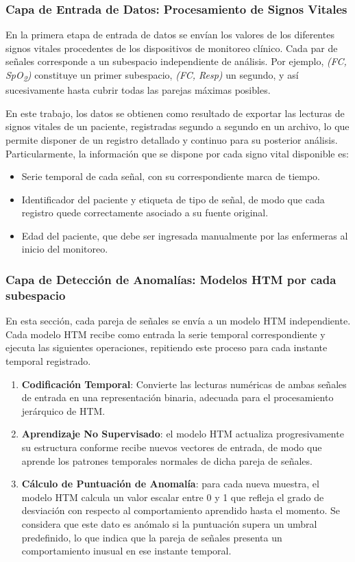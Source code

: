 \subsubsection*{Capa de Entrada de Datos: Procesamiento de Signos Vitales}

En la primera etapa de entrada de datos se envían los valores de los diferentes signos vitales procedentes de los dispositivos de monitoreo clínico. Cada par de señales corresponde a un subespacio independiente de análisis. Por ejemplo, \emph{(FC, SpO\textsubscript{2})} constituye un primer subespacio, \emph{(FC, Resp)} un segundo, y así sucesivamente hasta cubrir todas las parejas máximas posibles.

En este trabajo, los datos se obtienen como resultado de exportar las lecturas de signos vitales de un paciente, registradas segundo a segundo en un archivo, lo que permite disponer de un registro detallado y continuo para su posterior análisis. Particularmente, la información que se dispone por cada signo vital disponible es:

\begin{itemize}
  \item Serie temporal de cada señal, con su correspondiente marca de tiempo.
  \item Identificador del paciente y etiqueta de tipo de señal, de modo que cada registro quede correctamente asociado a su fuente original.
  \item Edad del paciente, que debe ser ingresada manualmente por las enfermeras al inicio del monitoreo.
\end{itemize}

\bigskip

\subsubsection*{Capa de Detección de Anomalías: Modelos HTM por cada subespacio}

En esta sección, cada pareja de señales se envía a un modelo HTM independiente. Cada modelo HTM recibe como entrada la serie temporal correspondiente y ejecuta las siguientes operaciones, repitiendo este proceso para cada instante temporal registrado.

\begin{enumerate}
  \item \textbf{Codificación Temporal}: Convierte las lecturas numéricas de ambas señales de entrada en una representación binaria, adecuada para el procesamiento jerárquico de HTM.
  \item \textbf{Aprendizaje No Supervisado}: el modelo HTM actualiza progresivamente su estructura conforme recibe nuevos vectores de entrada, de modo que aprende los patrones temporales normales de dicha pareja de señales.
  \item \textbf{Cálculo de Puntuación de Anomalía}: para cada nueva muestra, el modelo HTM calcula un valor escalar entre 0 y 1 que refleja el grado de desviación con respecto al comportamiento aprendido hasta el momento. Se considera que este dato es anómalo si la puntuación supera un umbral predefinido, lo que indica que la pareja de señales presenta un comportamiento inusual en ese instante temporal.
\end{enumerate}

